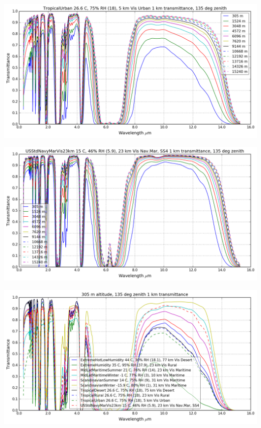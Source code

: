 \documentclass{workpackage}
\begin{document}
\begin{center}
\includegraphics{./pic/Analyse-Standard-Atmospheres_17_9.png}
\end{center}

\begin{center}
\includegraphics{./pic/Analyse-Standard-Atmospheres_17_10.png}
\end{center}

\begin{center}
\includegraphics{./pic/Analyse-Standard-Atmospheres_17_11.png}
\end{center}
\end{document}
